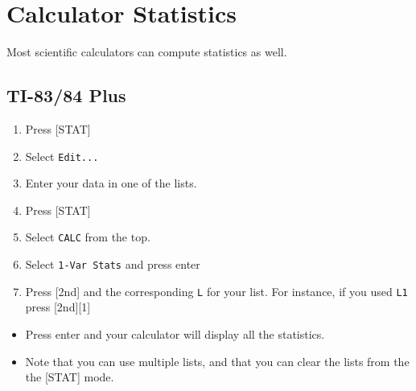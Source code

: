 \documentclass{article}
\begin{document}
\section{Calculator Statistics}
Most scientific calculators can compute statistics as well.

\subsection{TI-83/84 Plus}
\begin{enumerate}
    \item Press [STAT]
    \item Select \verb!Edit...!
    \item Enter your data in one of the lists. 
    \item Press [STAT]
    \item Select \verb!CALC! from the top.
    \item Select \verb!1-Var Stats! and press enter
    \item Press [2nd] and the corresponding \verb!L! for your list.
        For instance, if you used \verb!L1! press [2nd][1]
\end{enumerate}
\begin{itemize}
    \item Press enter and your calculator will display all the
        statistics.
    \item Note that you can use multiple lists, and that you can clear
        the lists from the the [STAT] mode.
\end{itemize}
\end{document}
